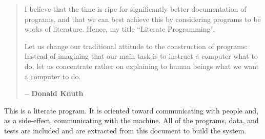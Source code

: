 \documentclass[dvipdfm]{book}
\begin{document}
\begin{titlepage}
{}
\vskip 0.1in
\center{\huge{\today}}
\end{titlepage}
\begin{quote}
I believe that the time is ripe for significantly better documentation
of programs, and that we can best achieve this by considering programs
to be works of literature. Hence, my title ``Literate Programming''.

Let us change our traditional attitude to the construction of programs:
Instead of imagining that our main task is to instruct a computer what to do,
let us concentrate rather on explaining to human beings what we want a
computer to do.

{\bf -- Donald Knuth} \cite{50}
\end{quote}

This is a literate program. It is oriented toward communicating with
people and, as a side-effect, communicating with the machine. All of
the programs, data, and tests are included and are extracted from
this document to build the system. 

\tableofcontents





















\begin{appendix}





\end{appendix}

\cleardoublepage
{}
{}
\printindex
\end{document}
